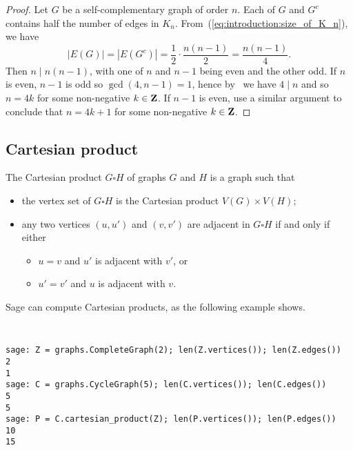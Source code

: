 \begin{proof}
Let $G$ be a self-complementary graph of order $n$. Each of $G$ and
$G^c$ contains half the number of edges in
$K_n$. From~(\ref{eq:introduction:size_of_K_n}), we have
\[
|E(G)|
=
|E(G^c)|
=
\frac{1}{2} \cdot \frac{n(n - 1)}{2}
=
\frac{n(n - 1)}{4}.
\]
Then $n \;|\; n(n - 1)$, with one of $n$ and $n - 1$ being even and
the other odd. If $n$ is even, $n - 1$ is odd so $\gcd(4, n-1) = 1$,
hence by~\cite[Theorem~1.9]{Shoup2008} we have $4 \;|\; n$ and so
$n = 4k$ for some non-negative $k \in \mathbf{Z}$. If $n - 1$ is even, use a
similar argument to conclude that $n = 4k + 1$ for some non-negative
$k \in \mathbf{Z}$.
\end{proof}



\subsection{Cartesian product}

The Cartesian product $G \square H$ of graphs $G$ and $H$ is a graph such that
%
\begin{itemize}
\item the vertex set of $G \square H$ is the Cartesian product
  $V(G) \times V(H)$;

\item any two vertices $(u, u')$ and $(v, v')$ are adjacent in
  $G \square H$ if and only if either
  \begin{itemize}
  \item $ u = v$ and $u'$ is adjacent with $v'$, or

  \item $u' = v'$ and $u$ is adjacent with $v$.
  \end{itemize}
\end{itemize}
%
Sage can compute Cartesian products, as the following example shows.
%
\begin{center}
\fontsize{9pt}{9pt}
\selectfont
\tt
\begin{lstlisting}
sage: Z = graphs.CompleteGraph(2); len(Z.vertices()); len(Z.edges())
2
1
sage: C = graphs.CycleGraph(5); len(C.vertices()); len(C.edges())
5
5
sage: P = C.cartesian_product(Z); len(P.vertices()); len(P.edges())
10
15
\end{lstlisting}
\end{center}

